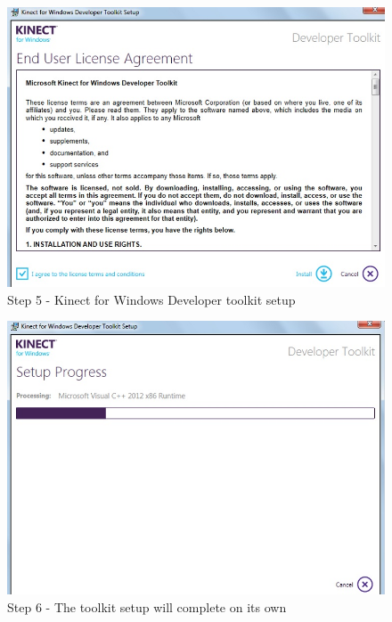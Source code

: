 \begin{flushleft}
\medskip
\begin{figure}
\begin{center}
\includegraphics[scale=0.7]{toolkit_step1}
\end{center}
\caption{Step 5 - Kinect for Windows Developer toolkit setup}
\label{fig:w6}
\end{figure}
\medskip
\begin{figure}
\begin{center}
\includegraphics[scale=0.7]{toolkit_step2}
\end{center}
\caption{Step 6 - The toolkit setup will complete on its own}
\label{fig:w7}
\end{figure}


\end{flushleft}
